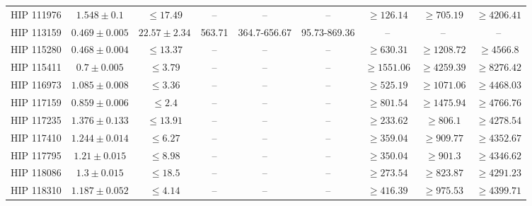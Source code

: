 {\begin{longtable}{|c|c|c|c|c|c|c|c|c|}
HIP 111976 & $ 1.548 \pm 0.1 $ & $\le 17.49 $ &-- &-- &-- & $\ge 126.14 $ & $\ge 705.19 $ & $\ge 4206.41 $ \\
HIP 113159 & $ 0.469 \pm 0.005 $ & $ 22.57 \pm 2.34 $ & 563.71 & 364.7-656.67 & 95.73-869.36 &-- &-- &-- \\
HIP 115280 & $ 0.468 \pm 0.004 $ & $\le 13.37 $ &-- &-- &-- & $\ge 630.31 $ & $\ge 1208.72 $ & $\ge 4566.8 $ \\
HIP 115411 & $ 0.7 \pm 0.005 $ & $\le 3.79 $ &-- &-- &-- & $\ge 1551.06 $ & $\ge 4259.39 $ & $\ge 8276.42 $ \\
HIP 116973 & $ 1.085 \pm 0.008 $ & $\le 3.36 $ &-- &-- &-- & $\ge 525.19 $ & $\ge 1071.06 $ & $\ge 4468.03 $ \\
HIP 117159 & $ 0.859 \pm 0.006 $ & $\le 2.4 $ &-- &-- &-- & $\ge 801.54 $ & $\ge 1475.94 $ & $\ge 4766.76 $ \\
HIP 117235 & $ 1.376 \pm 0.133 $ & $\le 13.91 $ &-- &-- &-- & $\ge 233.62 $ & $\ge 806.1 $ & $\ge 4278.54 $ \\
HIP 117410 & $ 1.244 \pm 0.014 $ & $\le 6.27 $ &-- &-- &-- & $\ge 359.04 $ & $\ge 909.77 $ & $\ge 4352.67 $ \\
HIP 117795 & $ 1.21 \pm 0.015 $ & $\le 8.98 $ &-- &-- &-- & $\ge 350.04 $ & $\ge 901.3 $ & $\ge 4346.62 $ \\
HIP 118086 & $ 1.3 \pm 0.015 $ & $\le 18.5 $ &-- &-- &-- & $\ge 273.54 $ & $\ge 823.87 $ & $\ge 4291.23 $ \\
HIP 118310 & $ 1.187 \pm 0.052 $ & $\le 4.14 $ &-- &-- &-- & $\ge 416.39 $ & $\ge 975.53 $ & $\ge 4399.71 $
\label{tab:lithium}
\end{longtable}}



